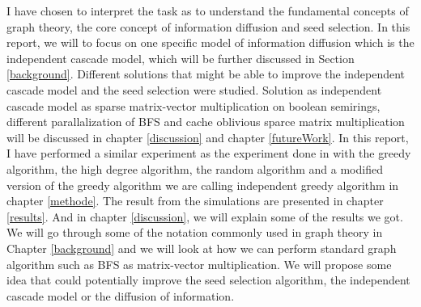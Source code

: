 I have chosen to interpret the task as to understand the fundamental concepts of graph theory, the core concept of information diffusion and seed selection. In this report, we will to focus on one specific model of information diffusion which is the independent cascade model, which will be further discussed in Section \ref{background}. Different solutions that might be able to improve the independent cascade model and the seed selection were studied. Solution as independent cascade model as sparse matrix-vector multiplication on boolean semirings, different parallalization of BFS and cache oblivious sparce matrix multiplication will be discussed in chapter \ref{discussion} and chapter \ref{futureWork}. In this report, I have performed a similar experiment as the experiment done in \cite{MaximizeSpread2003} with the greedy algorithm, the high degree algorithm, the random algorithm and a modified version of the greedy algorithm we are calling independent greedy algorithm in chapter \ref{methode}. The result from the simulations are presented in chapter \ref{results}. And in chapter \ref{discussion}, we will explain some of the results we got. We will go through some of the notation commonly used in graph theory in Chapter \ref{background} and we will look at how we can perform standard graph algorithm such as BFS as matrix-vector multiplication. We will propose some idea that could potentially improve the seed selection algorithm, the independent cascade model or the diffusion of information.
